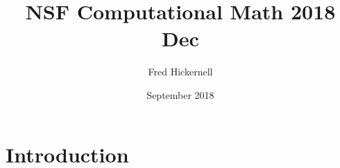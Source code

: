 \documentclass{article}
\title{NSF Computational Math 2018 Dec}
\author{Fred Hickernell}
\date{September 2018}
\begin{document}
\maketitle

\section{Introduction}
\end{document}
